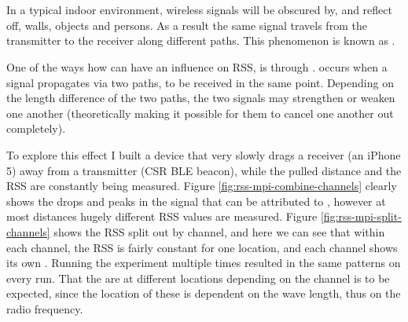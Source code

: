\section{\Mpi}
\label{sec:rss-mpi}
In a typical indoor environment, wireless signals will be obscured by, and reflect off, walls, objects and persons.
As a result the same signal travels from the transmitter to the receiver along different paths.
This phenomenon is known as \mpp.



One of the ways how \mpp can have an influence on RSS, is through \mpi.
\Mpi occurs when a signal propagates via two paths, to be received in the same point.
Depending on the length difference of the two paths, the two signals may strengthen or weaken one another (theoretically making it possible for them to cancel one another out completely).

To explore this effect I built a device that very slowly drags a receiver (an iPhone 5) away from a transmitter (CSR BLE beacon), while the pulled distance and the RSS are constantly being measured.
Figure \ref{fig:rss-mpi-combine-channels} clearly shows the drops and peaks in the signal that can be attributed to \mpi, however at most distances hugely different RSS values are measured.
Figure \ref{fig:rss-mpi-split-channels} shows the RSS split out by channel, and here we can see that within each channel, the RSS is fairly constant for one location, and each channel shows its own \mpids.
Running the experiment multiple times resulted in the same patterns on every run.
That the \mpids are at different locations depending on the channel is to be expected, since the location of these \mpids is dependent on the wave length, thus on the radio frequency.


